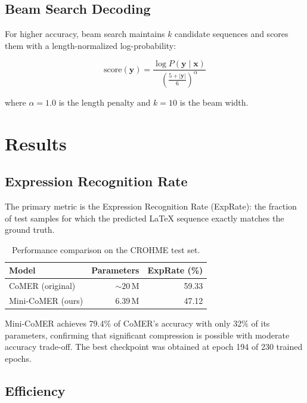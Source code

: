 \documentclass[11pt,a4paper]{article}
\begin{document}
\subsection{Beam Search Decoding}

For higher accuracy, beam search maintains $k$ candidate sequences and scores them with a length-normalized log-probability:

\begin{equation}
\text{score}(\mathbf{y}) = \frac{\log P(\mathbf{y} \mid \mathbf{x})}{\left(\frac{5 + |\mathbf{y}|}{6}\right)^{\!\alpha}}
\label{eq:beam}
\end{equation}

where $\alpha = 1.0$ is the length penalty and $k = 10$ is the beam width.

\section{Results}
\label{sec:results}

\subsection{Expression Recognition Rate}

The primary metric is the Expression Recognition Rate (ExpRate): the fraction of test samples for which the predicted \LaTeX{} sequence exactly matches the ground truth.

\begin{table}[H]
\centering
\caption{Performance comparison on the CROHME test set.}
\label{tab:results}
\begin{tabular}{lrr}
\toprule
\textbf{Model} & \textbf{Parameters} & \textbf{ExpRate (\%)} \\
\midrule
CoMER (original)   & ${\sim}20$\,M & 59.33 \\
Mini-CoMER (ours)  & 6.39\,M       & 47.12 \\
\bottomrule
\end{tabular}
\end{table}

Mini-CoMER achieves 79.4\% of CoMER's accuracy with only 32\% of its parameters, confirming that significant compression is possible with moderate accuracy trade-off. The best checkpoint was obtained at epoch 194 of 230 trained epochs.

\subsection{Efficiency}
\end{document}
